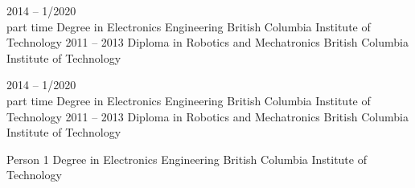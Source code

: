 \documentclass[9pt]{developercv} %
\begin{document}


\begin{entrylist}
	\entry
		{2014 -- 1/2020\\ \footnotesize{part time}}
		{Degree in Electronics Engineering}
		{British Columbia Institute of Technology}
		{\lorem\lorem}
	\entry
		{2011 -- 2013}
		{Diploma in Robotics and Mechatronics}
		{British Columbia Institute of Technology}
		{\lorem\lorem}
\end{entrylist}



\begin{entrylist}
	\entry
		{2014 -- 1/2020\\ \footnotesize{part time}}
		{Degree in Electronics Engineering}
		{British Columbia Institute of Technology}
		{\lorem\lorem}
	\entry
		{2011 -- 2013}
		{Diploma in Robotics and Mechatronics}
		{British Columbia Institute of Technology}
		{\lorem\lorem}
\end{entrylist}


\begin{entrylist}
	\entry
		{Person 1}
		{Degree in Electronics Engineering}
		{British Columbia Institute of Technology}
		{\lorem\lorem}
\end{entrylist}
\end{document}
